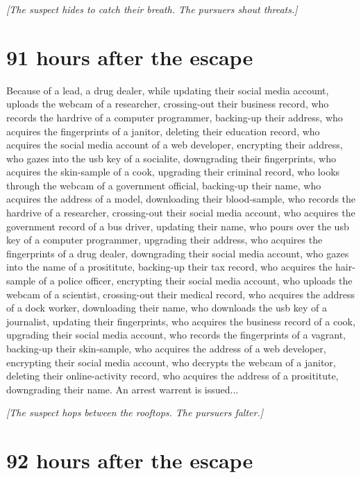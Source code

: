 \documentclass{report}
\begin{document}
\textit{[The suspect hides to catch their breath. The pursuers shout threats.]}


\section*{91 \small{hours after the escape}}

Because of a lead, a drug dealer, while updating their social media account, uploads the webcam of a researcher, crossing-out their business record, who records the hardrive of a computer programmer, backing-up their address, who acquires the fingerprints of a janitor, deleting their education record, who acquires the social media account of a web developer, encrypting their address, who gazes into the usb key of a socialite, downgrading their fingerprints, who acquires the skin-sample of a cook, upgrading their criminal record, who looks through the webcam of a government official, backing-up their name, who acquires the address of a model, downloading their blood-sample, who records the hardrive of a researcher, crossing-out their social media account, who acquires the government record of a bus driver, updating their name, who pours over the usb key of a computer programmer, upgrading their address, who acquires the fingerprints of a drug dealer, downgrading their social media account, who gazes into the name of a prosititute, backing-up their tax record, who acquires the hair-sample of a police officer, encrypting their social media account, who uploads the webcam of a scientist, crossing-out their medical record, who acquires the address of a dock worker, downloading their name, who downloads the usb key of a journalist, updating their fingerprints, who acquires the business record of a cook, upgrading their social media account, who records the fingerprints of a vagrant, backing-up their skin-sample, who acquires the address of a web developer, encrypting their social media account, who decrypts the webcam of a janitor, deleting their online-activity record, who acquires the address of a prosititute, downgrading their name. An arrest warrent is issued...

\textit{[The suspect hops between the rooftops. The pursuers falter.]}


\section*{92 \small{hours after the escape}}
\end{document}

